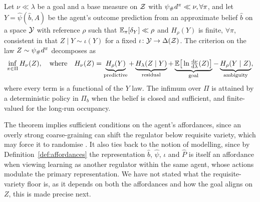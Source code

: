 \begin{theorem}
\label{thm:criterion}
    Let $\nu \ll \lambda$ be a goal and a base measure on $\mathcal Z$ with $\psi_\# d^{\pi} \ll \nu, \forall \pi$, and let $Y = \hat\psi(\hat b, A)$ be the agent's outcome prediction from an approximate belief $\hat b$ on a space $\mathcal Y$ with reference $\rho$ such that $\mathbb E_\pi[\delta_Y] \ll \rho$ and $H_\rho(Y)$ is finite, $\forall \pi$, consistent in that $Z \mid Y \sim \iota(Y)$ for a fixed $\iota\colon \mathcal Y \to \Delta(\mathcal Z)$.
    The criterion on the law $Z \sim \psi_\# d^{\pi}$ decomposes as
    \begin{equation}
      \inf_{\pi \in \Pi} H_\nu(Z), \quad \mathrm{where} \quad H_\nu(Z) = \underbrace{H_\rho(Y)}_{\text{predictive}} + \underbrace{H_\lambda(Z \mid Y)}_{\text{residual}} + \underbrace{\mathbb E\big[\ln \tfrac{\mathrm d\nu}{\mathrm d\lambda}(Z)\big]}_{\text{goal}} - \underbrace{H_\rho(Y \mid Z)}_{\text{ambiguity}},
      \label{eq:classes}
    \end{equation}
    where every term is a functional of the $Y$ law.
    The infimum over $\Pi$ is attained by a deterministic policy in $\Pi_b$ when the belief is closed and sufficient, and finite-valued for the long-run occupancy.
\end{theorem}

The theorem implies sufficient conditions on the agent's affordances, since an overly strong coarse-graining can shift the regulator below requisite variety, which may force it to randomise \citep{Singh-learning94}.
It also ties back to the notion of modelling, since by Definition~\ref{def:affordances} the representation $\hat b$, $\hat\psi$, $\iota$ and $\hat P$ is itself an affordance when viewing learning as another regulator within the same agent, whose actions modulate the primary representation.
We have not stated what the requisite-variety floor is, as it depends on both the affordances and how the goal aligns on $Z$, this is made precise next.

